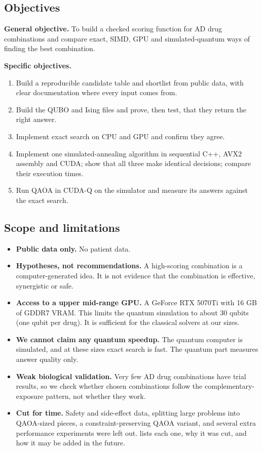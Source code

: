 \subsection{Objectives}

\textbf{General objective.} To build a checked scoring function for AD drug combinations and compare exact, SIMD, GPU and simulated-quantum ways of finding the best combination.

\textbf{Specific objectives.}
\begin{enumerate}
\item Build a reproducible candidate table and shortlist from public data, with clear documentation where every input comes from.
\item Build the QUBO and Ising files and prove, then test, that they return the right answer.
\item Implement exact search on CPU and GPU and confirm they agree.
\item Implement one simulated-annealing algorithm in sequential C++, AVX2 assembly and CUDA; show that all three make identical decisions; compare their execution times.
\item Run QAOA in CUDA-Q on the simulator and measure its answers against the exact search.
\end{enumerate}

\subsection{Scope and limitations}

\begin{itemize}
\item \textbf{Public data only.} No patient data.
\item \textbf{Hypotheses, not recommendations.} A high-scoring combination is a computer-generated idea. It is not evidence that the combination is effective, synergistic or safe.
\item \textbf{Access to a upper mid-range GPU.} A GeForce RTX 5070Ti with 16 GB of GDDR7 VRAM. This limits the quantum simulation to about 30 qubits (one qubit per drug). It is sufficient for the classical solvers at our sizes.
\item \textbf{We cannot claim any quantum speedup.} The quantum computer is simulated, and at these sizes exact search is fast. The quantum part measures answer quality only.
\item \textbf{Weak biological validation.} Very few AD drug combinations have trial results, so we check whether chosen combinations follow the complementary-exposure pattern, not whether they work.
\item \textbf{Cut for time.} Safety and side-effect data, splitting large problems into QAOA-sized pieces, a constraint-preserving QAOA variant, and several extra performance experiments were left out.  lists each one, why it was cut, and how it may be added in the future.
\end{itemize}

